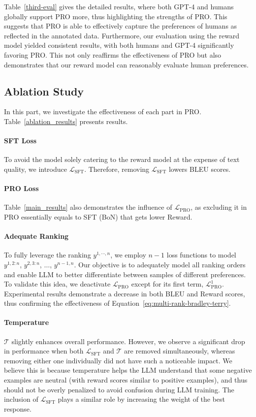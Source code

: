 Table~\ref{third-eval} gives the detailed results, where both GPT-4 and humans globally support PRO more, thus highlighting the strengths of PRO. This suggests that PRO is able to effectively capture the preferences of humans as reflected in the annotated data. Furthermore, our evaluation using the reward model yielded consistent results, with both humans and GPT-4 significantly favoring PRO. This not only reaffirms the effectiveness of PRO but also demonstrates that our reward model can reasonably evaluate human preferences. 

\subsection{Ablation Study}
\label{subsec:ablation}
In this part, we investigate the effectiveness of each part in PRO. Table~\ref{ablation_results} presents results. 

\paragraph{SFT Loss} To avoid the model solely catering to the reward model at the expense of text quality, we introduce $\mathcal{L}_{\text{SFT}}$. Therefore, removing $\mathcal{L}_{\text{SFT}}$ lowers BLEU scores. 

\paragraph{PRO Loss}
Table~\ref{main_results} also demonstrates the influence of $\mathcal{L}_{\text{PRO}}$, as excluding it in PRO essentially equals to SFT (BoN) that gets lower Reward. 

\paragraph{Adequate Ranking} To fully leverage the ranking $y^{1, \cdots, n}$, we employ $n-1$ loss functions to model $y^{1,2:n}$, $y^{2,3:n}$, $\dots$, $y^{n-1,n}$. Our objective is to adequately model all ranking orders and enable LLM to better differentiate between samples of different preferences. To validate this idea, we deactivate $\mathcal{L}_{\text{PRO}}$ except for its first term, $\mathcal{L}^1_{\text{PRO}}$. Experimental results demonstrate a decrease in both BLEU and Reward scores, thus confirming the effectiveness of Equation~\ref{eq:multi-rank-bradley-terry}.

\paragraph{Temperature} $\mathcal{T}$ slightly enhances overall performance. However, we observe a significant drop in performance when both $\mathcal{L}_{\text{SFT}}$ and $\mathcal{T}$ are removed simultaneously, whereas removing either one individually did not have such a noticeable impact. We believe this is because temperature helps the LLM understand that some negative examples are neutral (with reward scores similar to positive examples), and thus should not be overly penalized to avoid confusion during LLM training. The inclusion of $\mathcal{L}_{\text{SFT}}$ plays a similar role by increasing the weight of the best response.

